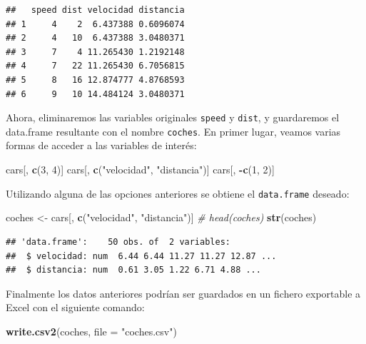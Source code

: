 \documentclass[]{book}
\newenvironment{Shaded}{\begin{snugshade}}{\end{snugshade}}
\newcommand{\KeywordTok}[1]{\textcolor[rgb]{0.13,0.29,0.53}{\textbf{#1}}}
\newcommand{\DataTypeTok}[1]{\textcolor[rgb]{0.13,0.29,0.53}{#1}}
\newcommand{\DecValTok}[1]{\textcolor[rgb]{0.00,0.00,0.81}{#1}}
\newcommand{\StringTok}[1]{\textcolor[rgb]{0.31,0.60,0.02}{#1}}
\newcommand{\CommentTok}[1]{\textcolor[rgb]{0.56,0.35,0.01}{\textit{#1}}}
\newcommand{\OperatorTok}[1]{\textcolor[rgb]{0.81,0.36,0.00}{\textbf{#1}}}
\newcommand{\NormalTok}[1]{#1}
\begin{document}
\begin{verbatim}
##   speed dist velocidad distancia
## 1     4    2  6.437388 0.6096074
## 2     4   10  6.437388 3.0480371
## 3     7    4 11.265430 1.2192148
## 4     7   22 11.265430 6.7056815
## 5     8   16 12.874777 4.8768593
## 6     9   10 14.484124 3.0480371
\end{verbatim}

Ahora, eliminaremos las variables originales \texttt{speed} y
\texttt{dist}, y guardaremos el data.frame resultante con el nombre
\texttt{coches}. En primer lugar, veamos varias formas de acceder a las
variables de interés:

\begin{Shaded}
\begin{Highlighting}[]
\NormalTok{cars[, }\KeywordTok{c}\NormalTok{(}\DecValTok{3}\NormalTok{, }\DecValTok{4}\NormalTok{)]}
\NormalTok{cars[, }\KeywordTok{c}\NormalTok{(}\StringTok{"velocidad"}\NormalTok{, }\StringTok{"distancia"}\NormalTok{)]}
\NormalTok{cars[, }\OperatorTok{-}\KeywordTok{c}\NormalTok{(}\DecValTok{1}\NormalTok{, }\DecValTok{2}\NormalTok{)]}
\end{Highlighting}
\end{Shaded}

Utilizando alguna de las opciones anteriores se obtiene el
\texttt{data.frame} deseado:

\begin{Shaded}
\begin{Highlighting}[]
\NormalTok{coches <-}\StringTok{ }\NormalTok{cars[, }\KeywordTok{c}\NormalTok{(}\StringTok{"velocidad"}\NormalTok{, }\StringTok{"distancia"}\NormalTok{)]}
\CommentTok{# head(coches)}
\KeywordTok{str}\NormalTok{(coches)}
\end{Highlighting}
\end{Shaded}

\begin{verbatim}
## 'data.frame':    50 obs. of  2 variables:
##  $ velocidad: num  6.44 6.44 11.27 11.27 12.87 ...
##  $ distancia: num  0.61 3.05 1.22 6.71 4.88 ...
\end{verbatim}

Finalmente los datos anteriores podrían ser guardados en un fichero
exportable a Excel con el siguiente comando:

\begin{Shaded}
\begin{Highlighting}[]
\KeywordTok{write.csv2}\NormalTok{(coches, }\DataTypeTok{file =} \StringTok{"coches.csv"}\NormalTok{)}
\end{Highlighting}
\end{Shaded}
\end{document}
